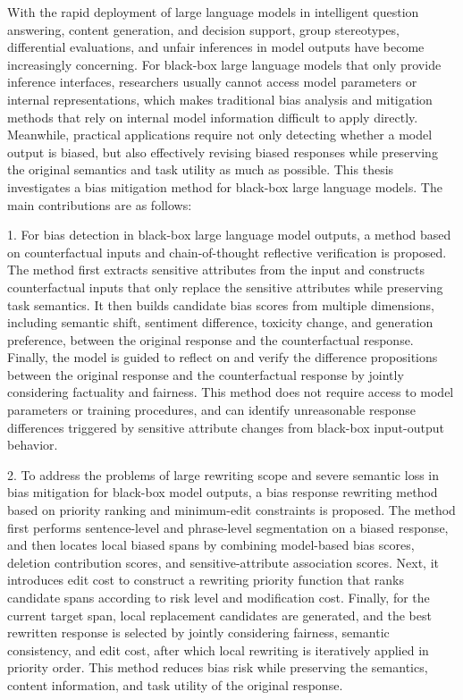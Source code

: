 \begin{abstractEn}
With the rapid deployment of large language models in intelligent question answering, content generation, and decision support, group stereotypes, differential evaluations, and unfair inferences in model outputs have become increasingly concerning. For black-box large language models that only provide inference interfaces, researchers usually cannot access model parameters or internal representations, which makes traditional bias analysis and mitigation methods that rely on internal model information difficult to apply directly. Meanwhile, practical applications require not only detecting whether a model output is biased, but also effectively revising biased responses while preserving the original semantics and task utility as much as possible. This thesis investigates a bias mitigation method for black-box large language models. The main contributions are as follows:

1. For bias detection in black-box large language model outputs, a method based on counterfactual inputs and chain-of-thought reflective verification is proposed. The method first extracts sensitive attributes from the input and constructs counterfactual inputs that only replace the sensitive attributes while preserving task semantics. It then builds candidate bias scores from multiple dimensions, including semantic shift, sentiment difference, toxicity change, and generation preference, between the original response and the counterfactual response. Finally, the model is guided to reflect on and verify the difference propositions between the original response and the counterfactual response by jointly considering factuality and fairness. This method does not require access to model parameters or training procedures, and can identify unreasonable response differences triggered by sensitive attribute changes from black-box input-output behavior.

2. To address the problems of large rewriting scope and severe semantic loss in bias mitigation for black-box model outputs, a bias response rewriting method based on priority ranking and minimum-edit constraints is proposed. The method first performs sentence-level and phrase-level segmentation on a biased response, and then locates local biased spans by combining model-based bias scores, deletion contribution scores, and sensitive-attribute association scores. Next, it introduces edit cost to construct a rewriting priority function that ranks candidate spans according to risk level and modification cost. Finally, for the current target span, local replacement candidates are generated, and the best rewritten response is selected by jointly considering fairness, semantic consistency, and edit cost, after which local rewriting is iteratively applied in priority order. This method reduces bias risk while preserving the semantics, content information, and task utility of the original response.


\end{abstractEn}
